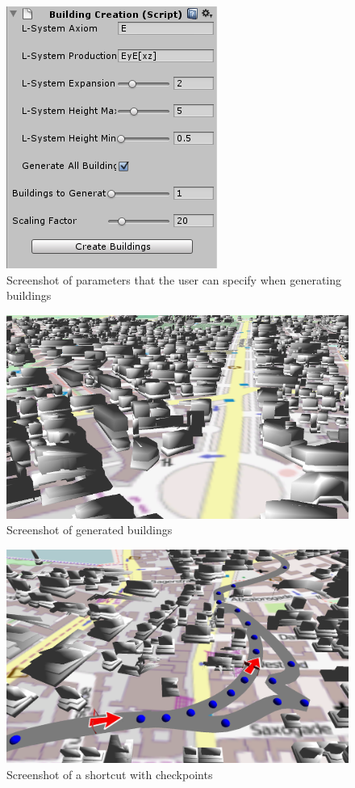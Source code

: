 \documentclass[conference]{IEEEtran}
\begin{document}
\begin{figure}[h!t]
\centering
\includegraphics[scale=0.8]{images/BuildingScript.png}
\caption{\label{buildings} Screenshot of parameters that the user can specify when generating buildings}
\end{figure}

\begin{figure}[h!t]
\centering
\includegraphics[scale=0.45]{images/Buildings4.png}
\caption{\label{buildings} Screenshot of generated buildings}
\end{figure}

\begin{figure}[h!t]
\centering
\includegraphics[scale=0.3]{images/Checkpoints1.png}
\caption{\label{buildings} Screenshot of a shortcut with checkpoints}
\end{figure}
\end{document}
